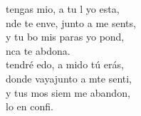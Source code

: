 \documentclass[12pt]{article}
\begin{document}
\begin{multicols*}{2}
\begin{cancion}
	\begin{chorus}%
	 tengas mio, a tu l yo esta,\\
	nde te enve, junto a me sents, \\
	y  tu bo mis paras yo pond,\\
	nca te abdona.\\
\jump
	 tendré edo, a mido tú erás,\\
	donde vayajunto a mte senti,\\
	y  tus mos siem me abandon, \\
	lo en  confi. \\
	\end{chorus}%
	\jump\\
\end{cancion}%


\end{multicols*}
\end{document}
